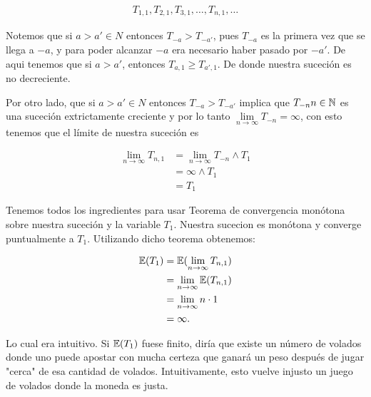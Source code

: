     \begin{align}
        T_{1,1}, T_{2,1}, T_{3,1}, \dots, T_{n,1},\dots
    \end{align}\par\null 
    
    Notemos que si $a>a' \in N$ entonces $T_{-a} > T_{-a'}$, pues $T_{-a}$ es la primera vez
	que se llega a $-a$, y para poder alcanzar $-a$ era necesario haber pasado por $-a'$.
	De aqui tenemos que si $a>a'$, entonces $T_{a,1} \geq T_{a',1}$. De donde nuestra suceción es 
	no decreciente.\par\null
	
	Por otro lado, que si $a>a' \in N$ entonces $T_{-a} > T_{-a'}$ implica que $T_{-n} n \in \mathbb{N}$ es 
	una suceción extrictamente creciente y por lo tanto 
	$\lim\limits_{n \rightarrow \infty} T_{-n} = \infty$, con esto tenemos que el límite de nuestra 
	suceción es 
	
    \begin{align}		
        \lim_{n\rightarrow\infty} T_{n,1}   &=  \lim_{n\rightarrow\infty} T_{-n} \wedge T_1 \\
                                            &=  \infty \wedge T_1                           \\
                                            &=  T_1
	\end{align}\par\null

	Tenemos todos los ingredientes para usar Teorema de convergencia monótona sobre nuestra suceción
	y la variable $T_1$. Nuestra sucecion es monótona y converge puntualmente a $T_1$. Utilizando
	dicho teorema obtenemos:
	
	\begin{align}
        \mathbb{E}(T_1)     &=  \mathbb{E}(\lim_{n\rightarrow\infty} T_{n,1})       \\
                    &=  \lim_{n\rightarrow\infty} \mathbb{E}(T_{n,1})       \\
                    &=  \lim_{n\rightarrow\infty} n\cdot 1          \\
                    &=  \infty.
	\end{align}\par\null
	
	Lo cual era intuitivo. Si $\mathbb{E}(T_1)$ fuese finito, diría que existe un número de volados donde
	uno puede apostar con mucha certeza que ganará un peso después de jugar "cerca" de esa cantidad
	de volados. Intuitivamente, esto vuelve injusto un juego de volados donde la moneda es
	justa.	